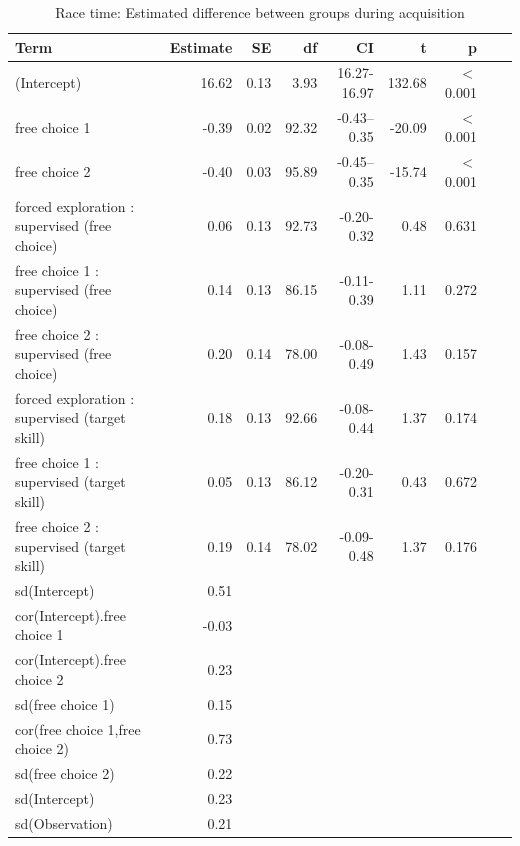 \documentclass[pdflatex,sn-mathphys-num]{sn-jnl}%
\theoremstyle{thmstyleone}%
\theoremstyle{thmstyletwo}%
\theoremstyle{thmstylethree}%
\begin{document}
\begin{appendices}
\begin{table}[h!]
\caption{Race time: Estimated difference between groups during acquisition}\label{table_racetime_acquisition_groupdifference}
\centering
\begin{tabular}{lrrrrrrrr}
  \hline
 Term & Estimate & SE & df & CI & t & p \\ 
  \hline
 (Intercept) & 16.62 & 0.13 & 3.93 & 16.27-16.97 & 132.68 &  $<$  0.001 \\ 
 free choice 1 & -0.39 & 0.02 & 92.32 & -0.43--0.35 & -20.09 &  $<$  0.001 \\ 
  free choice 2 & -0.40 & 0.03 & 95.89 & -0.45--0.35 & -15.74 &  $<$  0.001 \\ 
  forced exploration : supervised (free choice) & 0.06 & 0.13 & 92.73 & -0.20-0.32 & 0.48 &    0.631 \\ 
  free choice 1 : supervised (free choice) & 0.14 & 0.13 & 86.15 & -0.11-0.39 & 1.11 &   0.272 \\ 
  free choice 2 : supervised (free choice) & 0.20 & 0.14 & 78.00 & -0.08-0.49 & 1.43 &   0.157 \\ 
  forced exploration : supervised (target skill) & 0.18 & 0.13 & 92.66 & -0.08-0.44 & 1.37 &   0.174 \\ 
  free choice 1 : supervised (target skill) & 0.05 & 0.13 & 86.12 & -0.20-0.31 & 0.43 &   0.672 \\ 
  free choice 2 : supervised (target skill) & 0.19 & 0.14 & 78.02 & -0.09-0.48 & 1.37 &   0.176 \\ 
  sd(Intercept) & 0.51 &  &  &  &  &    \\ 
  cor(Intercept).free choice 1 & -0.03 &  &  &  &  &    \\ 
  cor(Intercept).free choice 2 & 0.23 &  &  &  &  &    \\ 
  sd(free choice 1) & 0.15 &  &  &  &  &    \\ 
  cor(free choice 1,free choice 2) & 0.73 &  &  &  &  &   \\ 
  sd(free choice 2) & 0.22 &  &  &  &  &    \\ 
  sd(Intercept) & 0.23 &  &  &  &  &   \\ 
  sd(Observation) & 0.21 &  &  &  &   &  \\ 
   \hline
\end{tabular}
\end{table}











\end{appendices}
\end{document}
